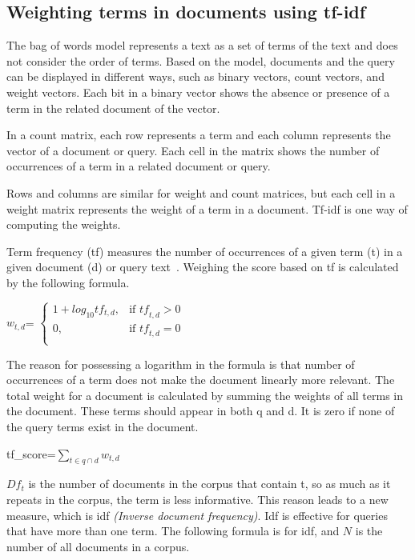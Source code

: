 \documentclass{IOS-Book-Article}
\begin{document}
\subsection{Weighting terms in documents using tf-idf}
\label{sec:tfidf}
The bag of words model represents a text as a set of terms of the text and does not consider the order of terms. Based on the model, documents and the query can be displayed in different ways, such as binary vectors, count vectors, and weight vectors. Each bit in a binary vector shows the absence or presence of a term in the related document of the vector.

In a count matrix, each row represents a term and each column represents the vector of a document or query. Each cell in the matrix shows the number of occurrences of a term in a related document or query. 

Rows and columns are similar for weight and count matrices, but each cell in a weight matrix represents the weight of a term in a document. Tf-idf is one way of computing the weights.

Term frequency (tf) measures the number of occurrences of a given term (t) in a given document (d) or query text~\citep{SALTON1988}. 
Weighing the score based on tf is calculated by the following formula. 
\begin{center} 
	$w_{t,d}$=
	$\begin{cases}
	1+log_{10} tf_{t,d}, & \text{if $\mathit{tf}_{t,d}>0$} \\
	0, & \text{if $\mathit{tf}_{t,d}=0$}\\
	\end{cases}$
\end{center}

The reason for possessing a logarithm in the formula is that number of occurrences of a term does not make the document linearly more relevant. The total weight for a document is calculated by summing the weights of all terms in the document. These terms should appear in both q and d. It is zero if none of the query terms exist in the document.

\begin{center}
	tf\_score=$\sum_{t\in q\cap d} w_{t,d}$
\end{center}

$Df_t$ is the number of documents in the corpus that contain t, so as much as it repeats in the corpus, the term is less informative. This reason leads to a new measure, which is idf \emph{(Inverse document frequency)}. Idf is effective for queries that have more than one term. The following formula is for idf, and $N$ is the number of all documents in a corpus.
\end{document}
